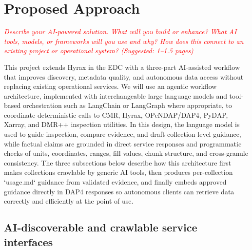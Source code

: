 \documentclass[11pt]{article}
\begin{document}
\section{Proposed Approach}
\textcolor{red}{\textit{Describe your AI-powered solution. What will you build or enhance? What AI tools, models, or frameworks will you use and why? How does this connect to an existing project or operational system? (Suggested: 1–1.5 pages)}}

This project extends Hyrax in the \ac{EDC} with a three-part \ac{AI}-assisted workflow that improves discovery, metadata quality, and autonomous data access without replacing existing operational services. We will use an agentic workflow architecture, implemented with interchangeable large language models and tool-based orchestration such as LangChain or LangGraph where appropriate, to coordinate deterministic calls to \ac{CMR}, Hyrax, \ac{OPeNDAP}/\ac{DAP4}, \ac{PyDAP}, Xarray, and \ac{DMR++} inspection utilities. In this design, the language model is used to guide inspection, compare evidence, and draft collection-level guidance, while factual claims are grounded in direct service responses and programmatic checks of units, coordinates, ranges, fill values, chunk structure, and cross-granule consistency. The three subsections below describe how this architecture first makes collections crawlable by generic \ac{AI} tools, then produces per-collection `usage.md` guidance from validated evidence, and finally embeds approved guidance directly in \ac{DAP4} responses so autonomous clients can retrieve data correctly and efficiently at the point of use.


\subsection{AI-discoverable and crawlable service interfaces}
\label{section-2.1}
\end{document}
